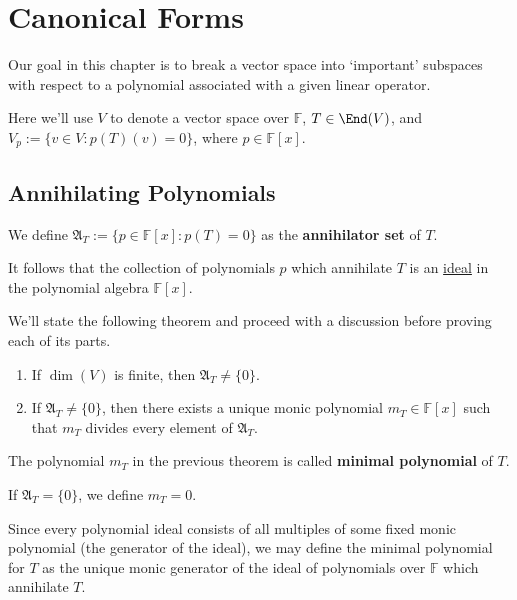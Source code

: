 \chapter{Canonical Forms}

Our goal in this chapter is to break a vector space into `important' subspaces with respect to a polynomial associated with a given linear operator.

Here we'll use $V$ to denote a vector space over $\mathbb{F}$, $T \in \End(V)$, and $V_p := \{ v \in V : p(T)(v) = 0 \}$, where $p \in \mathbb{F}[x]$.

\section{Annihilating Polynomials}

\begin{definition}
	We define $\mathfrak{A}_T := \{ p \in \mathbb{F}[x] : p(T) = 0 \}$ as the \textbf{annihilator set} of $T$.
\end{definition}

It follows that the collection of polynomials $p$ which annihilate $T$ is an \hyperref[def:ideal]{ideal} in the polynomial algebra $\mathbb{F}[x]$.

We'll state the following theorem and proceed with a discussion before proving each of its parts.

\begin{theorem}\label{thm:minimal-polynomial} \hfill
	\begin{enumerate}
		\item If $\dim (V)$ is finite, then $\mathfrak{A}_T \neq \{ 0 \}$.
		\item If $\mathfrak{A}_T \neq \{ 0 \}$, then there exists a unique monic polynomial $m_T \in \mathbb{F}[x]$ such that $m_T$ divides every element of $\mathfrak{A}_T$.
	\end{enumerate}
\end{theorem}

\begin{definition}
	The polynomial $m_T$ in the previous theorem is called \textbf{minimal polynomial} of $T$.
	
	If $\mathfrak{A}_T = \{ 0 \}$, we define $m_T = 0$.
\end{definition}

Since every polynomial ideal consists of all multiples of some fixed monic polynomial (the generator of the ideal), we may define the minimal polynomial for $T$ as the unique monic generator of the ideal of polynomials over $\mathbb{F}$ which annihilate $T$.

